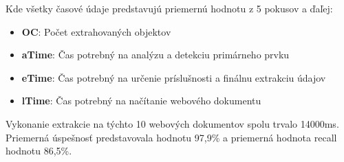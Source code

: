 Kde všetky časové údaje predstavujú priemernú hodnotu z 5 pokusov a ďaľej:

\begin{itemize}
    \item \textbf{OC}: Počet extrahovaných objektov
    \item \textbf{aTime}: Čas potrebný na analýzu a detekciu primárneho prvku
    \item \textbf{eTime}: Čas potrebný na určenie príslušnosti a finálnu extrakciu údajov
    \item \textbf{lTime}: Čas potrebný na načítanie webového dokumentu
\end{itemize}

Vykonanie extrakcie na týchto 10 webových dokumentov spolu trvalo 14000ms. Priemerná úspešnosť predstavovala hodnotu 97,9\% a priemerná hodnota recall hodnotu 86,5\%. 
